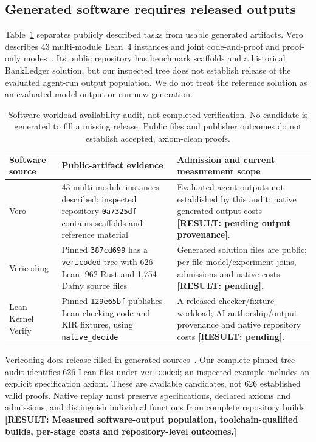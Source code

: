 \documentclass[10pt,twocolumn]{article}
\newcommand{\missing}[1]{\textbf{[RESULT: #1]}}
\begin{document}
\subsection{Generated software requires released outputs}
Table~\ref{tab:software} separates publicly described tasks from usable
generated artifacts. Vero describes 43 multi-module Lean~4 instances and
joint code-and-proof and proof-only modes~\cite{vero2026}.
Its public repository has benchmark scaffolds and a historical BankLedger
solution, but our inspected tree does not establish release of the
evaluated agent-run output population. We do not treat the reference
solution as an evaluated model output or run new generation.

\begin{table}[t]
\centering\small
\begin{tabular}{p{}p{}p{}}
\toprule
Software source & Public-artifact evidence & Admission and current measurement scope\\
\midrule
Vero & 43 multi-module instances described; inspected repository
\texttt{0a7325df} contains scaffolds and reference material &
Evaluated agent outputs not established by this audit; native
generated-output costs \missing{pending output provenance}.\\
Vericoding & Pinned \texttt{387cd699} has a \texttt{vericoded} tree with
626 Lean, 962 Rust and 1,754 Dafny source files &
Generated solution files are public; per-file model/experiment joins,
admissions and native costs \missing{pending}.\\
Lean Kernel Verify & Pinned \texttt{129e65bf} publishes Lean checking code
and KIR fixtures, using \texttt{native\_decide} &
A released checker/fixture workload; AI-authorship/output provenance and
native repository costs \missing{pending}.\\
\bottomrule
\end{tabular}
\caption{Software-workload availability audit, not completed verification.
No candidate is generated to fill a missing release. Public files and
publisher outcomes do not establish accepted, axiom-clean proofs.}
\label{tab:software}
\end{table}

Vericoding does release filled-in generated sources~\cite{vericoding2025}.
Our complete pinned tree audit identifies 626 Lean files under
\texttt{vericoded}; an inspected example includes an explicit specification
axiom. These are available candidates, not 626 established valid proofs.
Native replay must preserve specifications, declared axioms and admissions,
and distinguish individual functions from complete repository builds.
\missing{Measured software-output population, toolchain-qualified builds,
per-stage costs and repository-level outcomes.}
\end{document}

